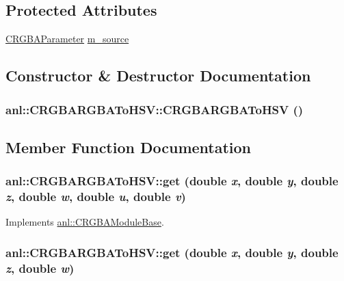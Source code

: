 \subsection*{Protected Attributes}
\begin{DoxyCompactItemize}
\item 
\hyperlink{classanl_1_1CRGBAParameter}{CRGBAParameter} \hyperlink{classanl_1_1CRGBARGBAToHSV_aed0d98a346ea73e2f53d74f7491d6820}{m\_\-source}
\end{DoxyCompactItemize}


\subsection{Constructor \& Destructor Documentation}
\hypertarget{classanl_1_1CRGBARGBAToHSV_aaaff1f615177198ad394a46aba86b3cb}{
\subsubsection[{CRGBARGBAToHSV}]{\setlength{\rightskip}{0pt plus 5cm}anl::CRGBARGBAToHSV::CRGBARGBAToHSV ()}}
\label{classanl_1_1CRGBARGBAToHSV_aaaff1f615177198ad394a46aba86b3cb}


\subsection{Member Function Documentation}
\hypertarget{classanl_1_1CRGBARGBAToHSV_ae1e0c7aad9142812d8df07f6c1102c00}{
\subsubsection[{get}]{ anl::CRGBARGBAToHSV::get (double {\em x}, \/  double {\em y}, \/  double {\em z}, \/  double {\em w}, \/  double {\em u}, \/  double {\em v})}}
\label{classanl_1_1CRGBARGBAToHSV_ae1e0c7aad9142812d8df07f6c1102c00}


Implements \hyperlink{classanl_1_1CRGBAModuleBase_aa5a0b719101302596a697aa8c2292f55}{anl::CRGBAModuleBase}.\hypertarget{classanl_1_1CRGBARGBAToHSV_afffc1b06757cd5a31d4e1adf8621a4b5}{
\subsubsection[{get}]{ anl::CRGBARGBAToHSV::get (double {\em x}, \/  double {\em y}, \/  double {\em z}, \/  double {\em w})}}
\label{classanl_1_1CRGBARGBAToHSV_afffc1b06757cd5a31d4e1adf8621a4b5}


